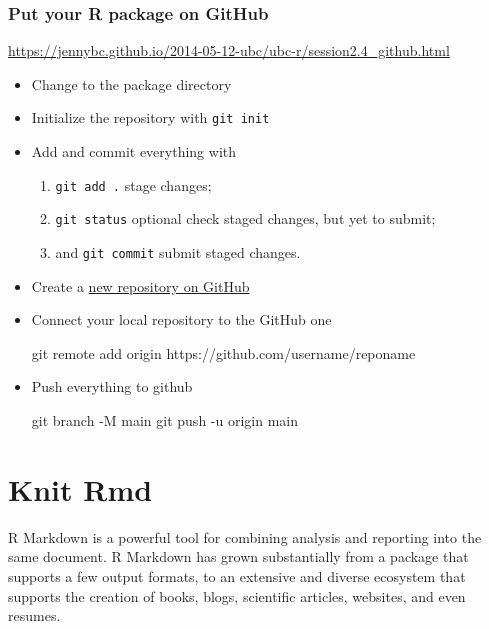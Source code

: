 \documentclass[
]{book}
\newenvironment{Shaded}{\begin{snugshade}}{\end{snugshade}}
\newcommand{\NormalTok}[1]{#1}
\providecommand{\tightlist}{%
  \setlength{\itemsep}{0pt}\setlength{\parskip}{0pt}}
\begin{document}
\subsection*{Put your R package on GitHub}\label{put-your-r-package-on-github}

\url{https://jennybc.github.io/2014-05-12-ubc/ubc-r/session2.4_github.html}

\begin{itemize}
\item
  Change to the package directory
\item
  Initialize the repository with \texttt{git\ init}
\item
  Add and commit everything with

  \begin{enumerate}
  \def\labelenumi{\arabic{enumi}.}
  \tightlist
  \item
    \texttt{git\ add\ .} stage changes;
  \item
    \texttt{git\ status} optional check staged changes, but yet to submit;
  \item
    and \texttt{git\ commit} submit staged changes.
  \end{enumerate}
\item
  Create a \href{https://github.com/new}{new repository on GitHub}
\item
  Connect your local repository to the GitHub one

\begin{Shaded}
\begin{Highlighting}[]
\NormalTok{git remote add origin https://github.com/username/reponame}
\end{Highlighting}
\end{Shaded}
\item
  Push everything to github

\begin{Shaded}
\begin{Highlighting}[]
\NormalTok{git branch {-}M main}
\NormalTok{git push {-}u origin main}
\end{Highlighting}
\end{Shaded}
\end{itemize}

\chapter{Knit Rmd}\label{knit-rmd}

R Markdown is a powerful tool for combining analysis and reporting into the same document. R Markdown has grown substantially from a package that supports a few output formats, to an extensive and diverse ecosystem that supports the creation of books, blogs, scientific articles, websites, and even resumes.
\end{document}
